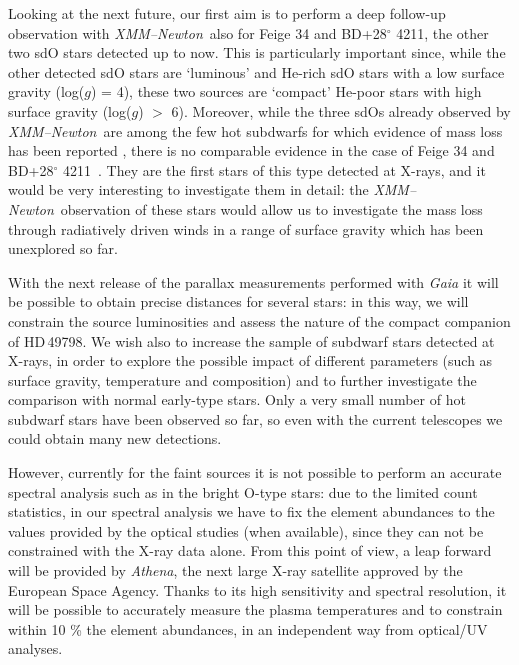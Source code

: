 \documentclass[USenglish,twocolumn]{article}
\def\XMM{{\em XMM--Newton}}
\def\BDthree{{BD+28$^\circ$ 4211}}
\def\HDone{HD\,49798}
\begin{document}
Looking at the next future, our first aim is to perform a deep follow-up observation with \XMM\ also for Feige 34 and \BDthree, the other two sdO stars detected up to now. This is particularly important since, while the other detected sdO stars are `luminous' and He-rich sdO stars with a low surface gravity (log($g$) = 4), these two sources are `compact' He-poor stars with high surface gravity (log($g$) $>$ 6). Moreover, while the three sdOs already observed by \XMM\ are among the few hot subdwarfs for which evidence of mass loss has been reported \citep{JefferyHamann10}, there is no comparable evidence in the case of Feige 34 and \BDthree\ \citep{Latour+13}. They are the first stars of this type detected at X-rays, and it would be very interesting to investigate them in detail: the \XMM\ observation of these stars would allow us to investigate the mass loss through radiatively driven winds in a range of surface gravity which has been unexplored so far.

With the next release of the parallax measurements performed with \textit{Gaia} it will be possible to obtain precise distances for several stars: in this way, we will constrain the source luminosities and assess the nature of the compact companion of \HDone. We wish also to increase the sample of subdwarf stars detected at X-rays, in order to explore the possible impact of different parameters (such as surface gravity, temperature and composition) and to further investigate the comparison with normal early-type stars. Only a very small number of hot subdwarf stars have been observed so far, so even with the current telescopes we could obtain many new detections. 

However, currently for the faint sources it is not possible to perform an accurate spectral analysis such as in the bright O-type stars: due to the limited count statistics, in our spectral analysis we have to fix the element abundances to the values provided by the optical studies (when available), since they can not be constrained with the X-ray data alone. From this point of view, a leap forward will be provided by \textit{Athena}, the next large X-ray satellite approved by the European Space Agency. Thanks to its high sensitivity and spectral resolution, it will be possible to accurately measure the plasma temperatures and to constrain within 10 \% the element abundances, in an independent way from optical/UV analyses.
\end{document}
